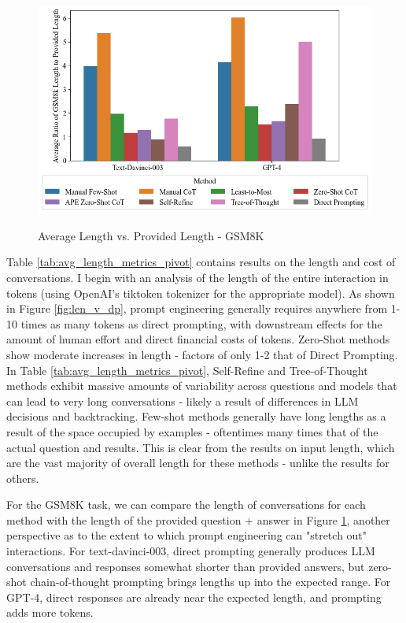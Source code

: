 \documentclass[11pt]{article}
\begin{document}
\begin{figure}
  \caption{Average Length vs. Provided Length - GSM8K}
  \centering
  \includegraphics[width=\textwidth]{../Output/gsm8k_length_vs_provided_means.png}
  \label{fig:gsm8k_len_v_prov}
\end{figure}

Table \ref{tab:avg_length_metrics_pivot} contains results on the length and cost of conversations. I begin with an analysis of the length of the entire interaction in tokens (using OpenAI's tiktoken tokenizer for the appropriate model). As shown in Figure \ref{fig:len_v_dp}, prompt engineering generally requires anywhere from 1-10 times as many tokens as direct prompting, with downstream effects for the amount of human effort and direct financial costs of tokens. Zero-Shot methods show moderate increases in length - factors of only 1-2 that of Direct Prompting. In Table \ref{tab:avg_length_metrics_pivot}, Self-Refine and Tree-of-Thought methods exhibit massive amounts of variability across questions and models that can lead to very long conversations - likely a result of differences in LLM decisions and backtracking. Few-shot methods generally have long lengths as a result of the space occupied by examples - oftentimes many times that of the actual question and results. This is clear from the results on input length, which are the vast majority of overall length for these methods - unlike the results for others.

For the GSM8K task, we can compare the length of conversations for each method with the length of the provided question + answer in Figure \ref{fig:gsm8k_len_v_prov}, another perspective as to the extent to which prompt engineering can "stretch out" interactions. For text-davinci-003, direct prompting generally produces LLM conversations and responses somewhat shorter than provided answers, but zero-shot chain-of-thought prompting brings lengths up into the expected range. For GPT-4, direct responses are already near the expected length, and prompting adds more tokens.
\end{document}
